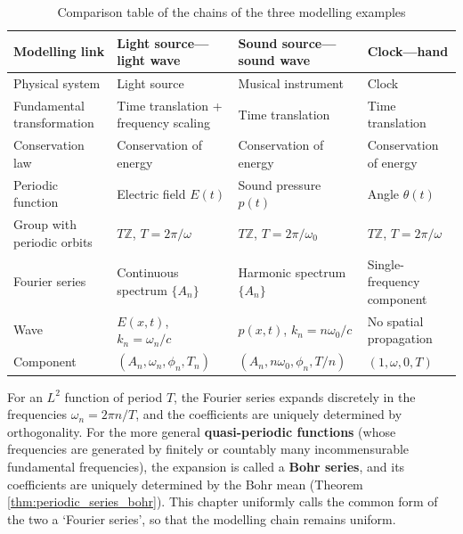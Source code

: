 \begin{table}[htbp]
    \centering
    \caption{Comparison table of the chains of the three modelling examples}
    \label{tab:modelling_examples}
    \small
    \renewcommand{\arraystretch}{1.25}
    \begin{tabularx}{\linewidth}{@{}>{\raggedright\arraybackslash}p{3.05cm} >{\raggedright\arraybackslash}X >{\raggedright\arraybackslash}X >{\raggedright\arraybackslash}X@{}}
    \toprule
    Modelling link & Light source---light wave & Sound source---sound wave & Clock---hand \\
    \midrule
    Physical system & Light source & Musical instrument & Clock \\
    Fundamental transformation & Time translation + frequency scaling & Time translation & Time translation \\
    Conservation law & Conservation of energy & Conservation of energy & Conservation of energy \\
    Periodic function & Electric field $E(t)$ & Sound pressure $p(t)$ & Angle $\theta(t)$ \\
    Group with periodic orbits & $T\mathbb{Z}$, $T=2\pi/\omega$ & $T\mathbb{Z}$, $T=2\pi/\omega_0$ & $T\mathbb{Z}$, $T=2\pi/\omega$ \\
    Fourier series & Continuous spectrum $\{A_n\}$ & Harmonic spectrum $\{A_n\}$ & Single-frequency component \\
    Wave & $E(x,t)$, $k_n=\omega_n/c$ & $p(x,t)$, $k_n=n\omega_0/c$ & No spatial propagation \\
    Component & $(A_n,\allowbreak\omega_n,\allowbreak\phi_n,\allowbreak T_n)$ & $(A_n,\allowbreak n\omega_0,\allowbreak\phi_n,\allowbreak T/n)$ & $(1,\allowbreak\omega,\allowbreak0,\allowbreak T)$ \\
    \bottomrule
    \end{tabularx}
\end{table}

\begin{remark}\label{rem:fourier_bohr_distinction}
For an $L^2$ function of period $T$, the Fourier series expands discretely in the frequencies $\omega_n=2\pi n/T$, and the coefficients are uniquely determined by orthogonality. For the more general \textbf{quasi-periodic functions} (whose frequencies are generated by finitely or countably many incommensurable fundamental frequencies), the expansion is called a \textbf{Bohr series}, and its coefficients are uniquely determined by the Bohr mean (Theorem \ref{thm:periodic_series_bohr}). This chapter uniformly calls the common form of the two a `Fourier series', so that the modelling chain remains uniform.
\end{remark}

